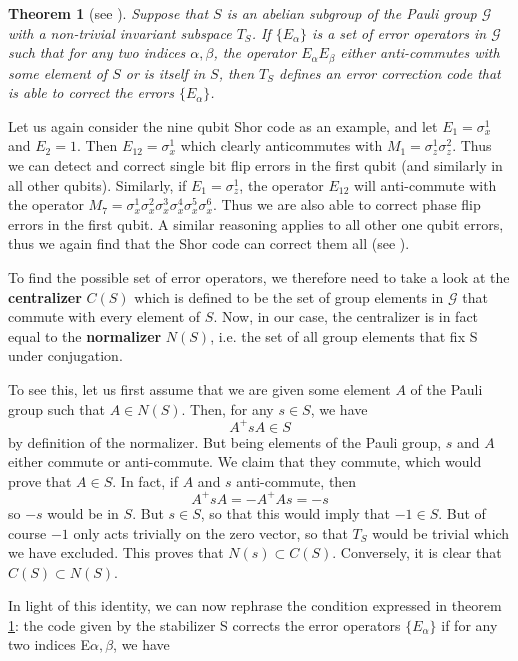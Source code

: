 \documentclass[a4paper, draft]{article}
\theoremstyle{own}
\newtheorem{thm}{Theorem}[section]
\theoremstyle{remark}
\begin{document}
\begin{thm}[see \cite{GThesis}]\label{stabilizercondition}
Suppose that $S$ is an abelian subgroup of the Pauli group $\mathcal{G}$ with a non-trivial invariant subspace $T_S$. If $\{E_\alpha \}$ is a set of error operators in $\mathcal{G}$ such that for any two indices $\alpha, \beta$, the operator $E_\alpha E_\beta$ either anti-commutes with some element of $S$ or is itself in $S$, then $T_S$ defines an error correction code that is able to correct the errors $\{E_\alpha \}$.
\end{thm}
	
Let us again consider the nine qubit Shor code as an example, and let $E_1 = \sigma^1_x$ and $E_2 = 1$. Then $E_{12} = \sigma_x^1$ which clearly anticommutes with $M_1 = \sigma_z^1 \sigma_z^2$. Thus we can detect and correct single bit flip errors in the first qubit (and similarly in all other qubits). Similarly, if $E_1 = \sigma_z^1$, the operator $E_{12}$ will anti-commute with the operator $M_7 = \sigma_x^1 \sigma_x^2 \sigma_x^3 \sigma_x^4 \sigma_x^5 \sigma_x^6$. Thus we are also able to correct phase flip errors in the first qubit. A similar reasoning applies to all other one qubit errors, thus we again find that the Shor code can correct them all (see \cite{GThesis}). 

To find the possible set of error operators, we therefore need to take a look at the {\bf centralizer} $C(S)$ which is defined to be the set of group elements in $\mathcal{G}$ that commute with every element of $S$. Now, in our case, the centralizer is in fact equal to the {\bf normalizer} $N(S)$, i.e. the set of all group elements that fix S under conjugation. 

To see this, let us first assume that we are given some element $A$ of the Pauli group such that $A \in N(S)$. Then, for any $s \in S$, we have
$$
A^+ s A \in S
$$
by definition of the normalizer. But being elements of the Pauli group, $s$ and $A$ either commute or anti-commute. We claim that they commute, which would prove that $A \in S$. In fact, if $A$ and $s$ anti-commute, then
$$
A^+ s A = - A^+ A s = - s
$$
so $-s$ would be in $S$. But $s \in S$, so that this would imply that $-1 \in S$. But of course $-1$ only acts trivially on the zero vector, so that $T_S$ would be trivial which we have excluded. This proves that $N(s) \subset C(S)$. Conversely, it is clear that $C(S) \subset N(S)$.

In light of this identity, we can now rephrase the condition expressed in theorem \ref{stabilizercondition}: the code given by the stabilizer S corrects the error operators $\{ E_\alpha \}$ if for any two indices E$\alpha, \beta$, we have 
\end{document}
